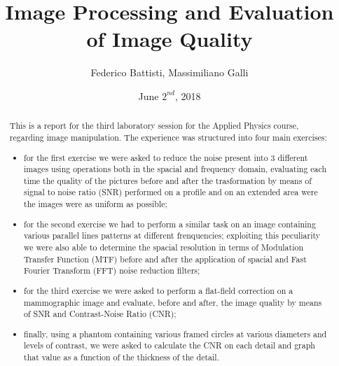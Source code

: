\documentclass[a4paper]{article}
\begin{document}
\title{Image Processing and Evaluation of Image Quality}
\author{Federico Battisti, Massimiliano Galli}
\date{June $2^{nd}$, 2018}
\maketitle

\begin{abstract}
	This is a report for the third laboratory session for the Applied Physics course, regarding image manipulation. The experience was structured into four main exercises:
	\begin{itemize}
		\item for the first exercise we were asked to reduce the noise present into 3 different images using operations both in the spacial and frequency domain, evaluating each time the quality of the pictures before and after the trasformation by means of signal to noise ratio (SNR) performed on a profile and on an extended area were the images were as uniform as possible;
    \item for the second exercise we had to perform a similar task on an image containing various parallel lines patterns at different frenquencies; exploiting this peculiarity we were also able to determine the spacial resolution in terms of Modulation Transfer Function (MTF) before and after the application of spacial and Fast Fourier Transform (FFT) noise reduction filters;
		\item for the third exercise we were asked to perform a flat-field correction on a mammographic image and evaluate, before and after, the image quality by means of SNR and Contrast-Noise Ratio (CNR);
    \item finally, using a phantom containing various framed circles at various diameters and levels of contrast, we were asked to calculate the CNR on each detail and graph that value as a function of the thickness of the detail.
	\end{itemize}
\end{abstract}

\clearpage
\end{document}
